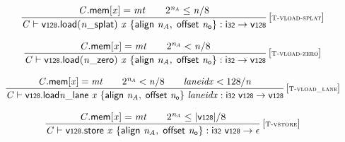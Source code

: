$$
\begin{array}{@{}c@{}}\displaystyle
\frac{
{\mathit{C}}.\mathsf{mem}[{\mathit{x}}] = {\mathit{mt}}
 \qquad
{2^{{\mathit{n}}_{{\mathit{A}}}}} \leq {\mathit{n}} / 8
}{
{\mathit{C}} \vdash {\mathsf{v{\scriptstyle128}.load}}{({{{\mathit{n}}}{\mathsf{\_}}}{\mathsf{splat}})}~{\mathit{x}}~\{ \begin{array}[t]{@{}l@{}}
\mathsf{align}~{\mathit{n}}_{{\mathit{A}}},\; \mathsf{offset}~{\mathit{n}}_{{\mathsf{o}}} \}\end{array} : \mathsf{i{\scriptstyle32}} \rightarrow \mathsf{v{\scriptstyle128}}
} \, {[\textsc{\scriptsize T{-}vload{-}splat}]}
\qquad
\end{array}
$$

$$
\begin{array}{@{}c@{}}\displaystyle
\frac{
{\mathit{C}}.\mathsf{mem}[{\mathit{x}}] = {\mathit{mt}}
 \qquad
{2^{{\mathit{n}}_{{\mathit{A}}}}} < {\mathit{n}} / 8
}{
{\mathit{C}} \vdash {\mathsf{v{\scriptstyle128}.load}}{({{{\mathit{n}}}{\mathsf{\_}}}{\mathsf{zero}})}~{\mathit{x}}~\{ \begin{array}[t]{@{}l@{}}
\mathsf{align}~{\mathit{n}}_{{\mathit{A}}},\; \mathsf{offset}~{\mathit{n}}_{{\mathsf{o}}} \}\end{array} : \mathsf{i{\scriptstyle32}} \rightarrow \mathsf{v{\scriptstyle128}}
} \, {[\textsc{\scriptsize T{-}vload{-}zero}]}
\qquad
\end{array}
$$

$$
\begin{array}{@{}c@{}}\displaystyle
\frac{
{\mathit{C}}.\mathsf{mem}[{\mathit{x}}] = {\mathit{mt}}
 \qquad
{2^{{\mathit{n}}_{{\mathit{A}}}}} < {\mathit{n}} / 8
 \qquad
{\mathit{laneidx}} < 128 / {\mathit{n}}
}{
{\mathit{C}} \vdash {{{\mathsf{v{\scriptstyle128}.load}}{{\mathit{n}}}}{\mathsf{\_}}}{\mathsf{lane}}~{\mathit{x}}~\{ \begin{array}[t]{@{}l@{}}
\mathsf{align}~{\mathit{n}}_{{\mathit{A}}},\; \mathsf{offset}~{\mathit{n}}_{{\mathsf{o}}} \}\end{array}~{\mathit{laneidx}} : \mathsf{i{\scriptstyle32}}~\mathsf{v{\scriptstyle128}} \rightarrow \mathsf{v{\scriptstyle128}}
} \, {[\textsc{\scriptsize T{-}vload\_lane}]}
\qquad
\end{array}
$$

$$
\begin{array}{@{}c@{}}\displaystyle
\frac{
{\mathit{C}}.\mathsf{mem}[{\mathit{x}}] = {\mathit{mt}}
 \qquad
{2^{{\mathit{n}}_{{\mathit{A}}}}} \leq {|\mathsf{v{\scriptstyle128}}|} / 8
}{
{\mathit{C}} \vdash \mathsf{v{\scriptstyle128}.store}~{\mathit{x}}~\{ \begin{array}[t]{@{}l@{}}
\mathsf{align}~{\mathit{n}}_{{\mathit{A}}},\; \mathsf{offset}~{\mathit{n}}_{{\mathsf{o}}} \}\end{array} : \mathsf{i{\scriptstyle32}}~\mathsf{v{\scriptstyle128}} \rightarrow \epsilon
} \, {[\textsc{\scriptsize T{-}vstore}]}
\qquad
\end{array}
$$

